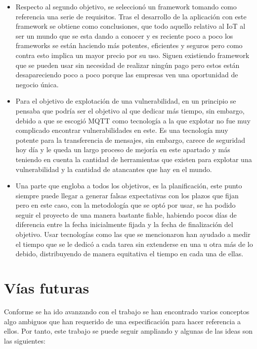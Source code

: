 {\begin{itemize}
    \item Respecto al segundo objetivo, se seleccionó un framework tomando como referencia una serie de requisitos. Tras el desarrollo de la aplicación con este framework se obtiene como conclusiones, que todo aquello relativo al IoT al ser un mundo que se esta dando a conocer y es reciente poco a poco los frameworks se están haciendo más potentes, eficientes y seguros pero como contra esto implica un mayor precio por su uso. Siguen existiendo framework que se pueden usar sin necesidad de realizar ningún pago pero estos están desapareciendo poco a poco porque las empresas ven una oportunidad de negocio única.
    \item Para el objetivo de explotación de una vulnerabilidad, en un principio se pensaba que podría ser el objetivo al que dedicar más tiempo, sin embargo, debido a que se escogió MQTT como tecnología a la que explotar no fue muy complicado encontrar vulnerabilidades en este. Es una tecnología muy potente para la transferencia de mensajes, sin embargo, carece de seguridad hoy día y le queda un largo proceso de mejoría en este apartado y más teniendo en cuenta la cantidad de herramientas que existen para explotar una vulnerabilidad y la cantidad de atancantes que hay en el mundo.
    \item Una parte que engloba a todos los objetivos, es la planificación, este punto siempre puede llegar a generar falsas expectativas con los plazos que fijan pero en este caso, con la metodología que se optó por usar, se ha podido seguir el proyecto de una manera bastante fiable, habiendo pocos días de diferencia entre la fecha inicialmente fijada y la fecha de finalización del objetivo. Usar tecnologías como las que se mencionaron han ayudado a medir el tiempo que se le dedicó a cada tarea sin extenderse en una u otra más de lo debido, distribuyendo de manera equitativa el tiempo en cada una de ellas.
\end{itemize}

\section{Vías futuras}

Conforme se ha ido avanzando con el trabajo se han encontrado varios conceptos algo ambiguos que han requerido de una especificación para hacer referencia a ellos. Por tanto, este trabajo se puede seguir ampliando y algunas de las ideas son las siguientes:

}

